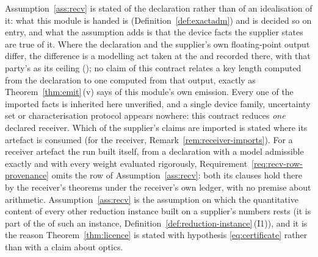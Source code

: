 
\begin{remark}\label{rem:recv-scope}
Assumption~\ref{ass:recv} is stated of the declaration rather than of an
idealisation of it: what this module is handed is 
(Definition~\ref{def:exactadm}) and is decided so on entry, and what the
assumption adds is that the device facts the supplier states are true of
it. Where the declaration and the supplier's own floating-point output
differ, the difference is a modelling act taken at the  and
recorded there, with that party's  as its ceiling
(); no claim of this contract
relates a key length computed from the declaration to one computed from
that output, exactly as Theorem~\ref{thm:emit}\,(v) says of this module's
own emission. Every one of the imported facts is inherited here unverified,
and a single device family, uncertainty set or characterisation protocol
appears nowhere: this contract reduces \emph{one} declared receiver. Which
of the supplier's claims are imported is stated where its artefact is
consumed (for the receiver, Remark~\ref{rem:receiver-imports}).
For a receiver artefact the run built itself, from a declaration with a
model admissible exactly and with every weight evaluated rigorously,
Requirement~\ref{req:recv-row-provenance} omits the row of
Assumption~\ref{ass:recv}: both its clauses hold there by the receiver's
theorems under the receiver's own ledger, with no premise about arithmetic.
Assumption~\ref{ass:recv} is the assumption on which the quantitative
content of every other reduction instance built on a supplier's numbers
rests (it
is part of the  of such an instance,
Definition~\ref{def:reduction-instance}\,(I1)), and it is the reason
Theorem~\ref{thm:licence} is stated with hypothesis \eqref{eq:certificate}
rather than with a claim about optics.
\end{remark}
